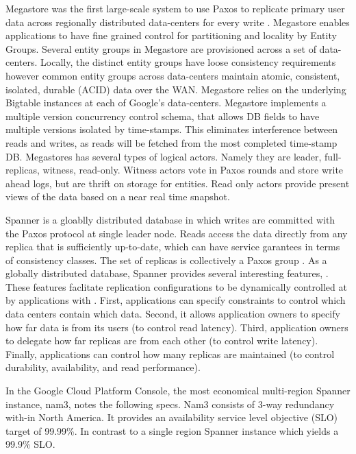 \documentclass[conference]{IEEEtran}
\begin{document}

Megastore was the first large-scale system to use Paxos to replicate primary user data across regionally distributed data-centers for every write \cite{megastore}. Megastore enables applications to have fine grained control for partitioning and locality by Entity Groups. Several entity groups in Megastore are provisioned across a set of data-centers. Locally, the distinct entity groups have loose consistency requirements however common entity groups across data-centers maintain atomic, consistent, isolated, durable (ACID) data over the WAN. Megastore relies on the underlying Bigtable \cite{bigtable} instances at each of Google's data-centers. Megastore implements a multiple version concurrency control schema, that allows DB fields to have multiple versions isolated by time-stamps. This eliminates interference between reads and writes, as reads will be fetched from the most completed time-stamp DB. Megastores has several types of logical actors. Namely they are leader, full-replicas, witness, read-only. Witness actors vote in Paxos rounds and store write ahead logs, but are thrift on storage for entities. Read only actors provide present views of the data based on a near real time snapshot.

Spanner is a gloablly distributed database in which writes are committed with the Paxos protocol at single leader node. Reads access the data directly from any replica  that  is  sufficiently  up-to-date, which can have service garantees in terms of consistency classes.  The  set  of replicas is collectively a Paxos group \cite{Spanner}. As a globally distributed database, Spanner provides several interesting features, \cite{Spanner}. These features faclitate replication configurations to be dynamically controlled at by applications with . First, applications can specify constraints to control which data centers contain which data. Second, it allows application owners to specify how far data is from its users (to control read latency). Third, application owners to delegate how far replicas  are  from  each  other  (to  control  write  latency). Finally, applications can control  how  many  replicas  are maintained (to control durability, availability, and read performance). 

In the Google Cloud Platform Console, the most economical multi-region Spanner instance, nam3, notes the following specs. Nam3 consists of 3-way redundancy with-in North America. It provides an availability service level objective (SLO) target of 99.99\%. In contrast to a single region Spanner instance which yields a 99.9\% SLO. 
\end{document}
